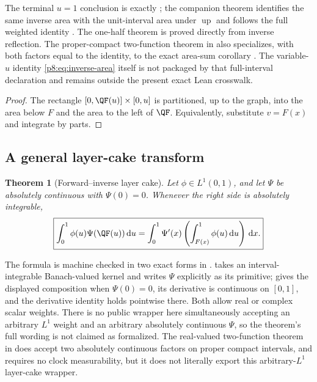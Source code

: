 \documentclass[11pt,oneside]{article}
\newtheorem{theorem}{Theorem}[section]
\theoremstyle{definition}
\theoremstyle{remark}
\newcommand{\Up}{\operatorname{up}}
\newcommand{\dd}{\,\mathrm d}
\newcommand{\1}{\mathbf 1}
\begin{document}
The terminal \(u=1\) conclusion is exactly
; the companion theorem
 identifies the same
inverse area with the unit-interval area under \(\Up\) and follows the full weighted
identity .  The one-half theorem is proved
directly from inverse reflection.  The proper-compact two-function theorem
 in
 also specializes, with both factors equal to the identity,
to the exact area-sum corollary
.
The variable-\(u\) identity \eqref{p8:eq:inverse-area} itself is not packaged by that
full-interval declaration and remains outside the present exact Lean crosswalk.

\begin{proof}
The rectangle \([0,\QF(u)]\times[0,u]\) is partitioned, up to the graph, into
the area below \(F\) and the area to the left of \(\QF\).  Equivalently,
substitute \(v=F(x)\) and integrate by parts.
\end{proof}

\subsection{A general layer-cake transform}

\begin{theorem}[Forward--inverse layer cake]
\label{p8:thm:inverse-layercake}
Let \(\phi\in L^1(0,1)\), and let \(\Psi\) be absolutely continuous with
\(\Psi(0)=0\).  Whenever the right side is absolutely integrable,
\begin{equation}
 \boxed{
 \int_0^1\phi(u)\Psi(\QF(u))\dd u
 =\int_0^1\Psi'(x)\left(\int_{F(x)}^1\phi(u)\dd u\right)\dd x.}
 \label{p8:eq:inverse-layercake}
\end{equation}
\statusprovedPartll
\end{theorem}

\begin{statusbox}
The formula is machine checked in two exact forms in .
 takes an
interval-integrable Banach-valued kernel and writes \(\Psi\) explicitly as its primitive;
 gives the displayed composition when
\(\Psi(0)=0\), its derivative is continuous on \([0,1]\), and the derivative identity
holds pointwise there.  Both allow real or complex scalar weights.  There is no public
wrapper here simultaneously accepting an arbitrary \(L^1\) weight and an arbitrary
absolutely continuous \(\Psi\), so the theorem's full wording is not claimed as
formalized.  The real-valued two-function theorem in 
does accept two absolutely continuous factors on proper compact intervals, and requires
no clock measurability, but it does not literally export this arbitrary-\(L^1\)
layer-cake wrapper.
\end{statusbox}
\end{document}
